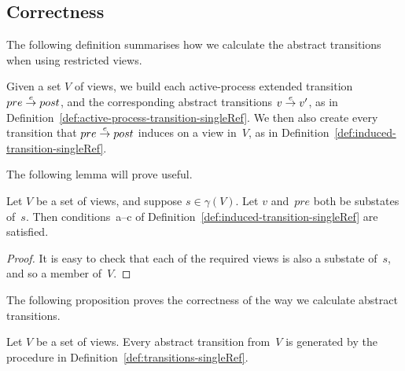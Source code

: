 \subsection{Correctness}

The following definition summarises how we calculate the abstract transitions
when using restricted views.
%
\begin{definition}
\label{def:transitions-singleRef}
Given a set $V$ of views, we build each active-process extended transition
$pre \stackrel{e}\rightarrow post$, and the corresponding abstract transitions $v \stackrel{e}\rightarrow
v'$, as in Definition~\ref{def:active-process-transition-singleRef}.
%
We then also create every transition that $pre \stackrel{e}\rightarrow post$ induces on a
view in~$V$, as in Definition~\ref{def:induced-transition-singleRef}.
\end{definition}

The following lemma will prove useful.
%
\begin{lemma}
\label{lem:induced-conditions}
Let $V$ be a set of views, and suppose $s \in \gamma(V)$.  Let $v$ and~$pre$
both be substates of~$s$.  Then conditions~a--c of
Definition~\ref{def:induced-transition-singleRef} are satisfied.
\end{lemma}
%
\begin{proof}
It is easy to check that each of the required views is also a substate of~$s$,
and so a member of~$V$.
\end{proof}


The following proposition proves the correctness of the way we calculate
abstract transitions.
%
\begin{prop}
Let $V$ be a set of views.  Every abstract transition from~$V$ is generated by
the procedure in Definition~\ref{def:transitions-singleRef}.
\end{prop}

